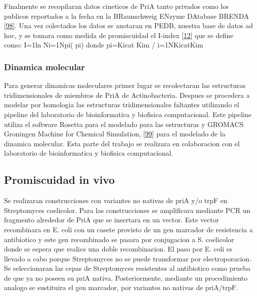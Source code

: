 \documentclass[12pt,twoside]{reedthesis}
\begin{document}
  Finalmente se recopilaran datos cineticos de PriA tanto privados como
  los publicos reportados a la fecha en la BRaunschweig ENzyme DAtabase
  BRENDA {[}\protect\hyperlink{ref-scheer_brenda_2011}{98}{]}. Una vez
  colectados los datos se anotaran en PEDB, nuestra base de datos ad hoc,
  y se tomara como medida de promiscuidad el I-index
  {[}\protect\hyperlink{ref-nath_quantitative_2008}{12}{]} que se define
  como: I=1ln Ni=1Npi( pi) donde pi=Kicat Kim / i=1NKicatKim
  
  \subsubsection{Dinamica molecular}\label{dinamica-molecular}
  
  Para generar dinamicas moleculares primer lugar se recolectaran las
  estructuras tridimensionales de miembros de PriA de Actinobacteria.
  Despues se procedera a modelar por homologia las estructuras
  tridimensionales faltantes utilizando el pipeline del laboratorio de
  bioinformatica y biofisica computacional. Este pipeline utiliza el
  software Rosetta para el modelado para las estructuras y GROMACS
  Groningen Machine for Chemical Simulation,
  {[}\protect\hyperlink{ref-van_der_spoel_gromacs_2005}{99}{]} para el
  modelado de la dinamica molecular. Esta parte del trabajo se realizara
  en colaboracion con el laboratorio de bioinformatica y biofisica
  computacional.
  
  \subsection{Promiscuidad in vivo}\label{promiscuidad-in-vivo}
  
  Se realizaran construcciones con variantes no nativas de priA y/o trpF
  en Streptomyces coelicolor. Para las construcciones se amplificara
  mediante PCR un fragmento alrededor de PriA que se insertara en un
  vector. Este vector recombinara en E. coli con un casete provisto de un
  gen marcador de resistencia a antibiotico y este gen recombinado se
  pasara por conjugacion a S. coelicolor donde se espera que realice una
  doble recombinacion. El paso por E. coli es llevado a cabo porque
  Streptomyces no se puede transformar por electroporacion. Se
  seleccionaran las cepas de Streptomyces resistentes al antibiotico como
  prueba de que ya no poseen su priA nativa. Posteriormente, mediante un
  procedimiento analogo se sustituira el gen marcador, por variantes no
  nativas de priA/trpF.
  
\end{document}
